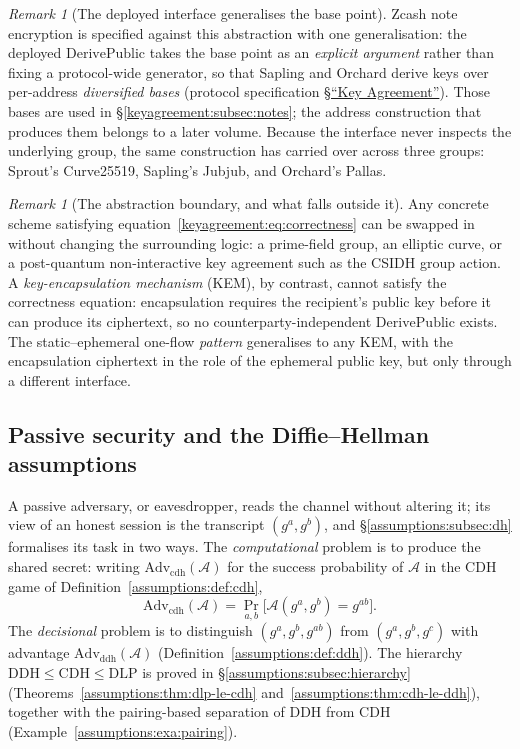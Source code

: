 \documentclass[11pt,a4paper]{article}
\theoremstyle{definition}
\theoremstyle{remark}
\newtheorem{remark}[theorem]{Remark}
\begin{document}
\begin{remark}[The deployed interface generalises the base point]
\label{keyagreement:rem:deployed-abstraction}
Zcash note encryption is specified against this abstraction with one
generalisation: the deployed \(\mathrm{DerivePublic}\) takes the base
point as an \emph{explicit argument} rather than fixing a
protocol-wide generator, so that Sapling and Orchard derive keys over
per-address \emph{diversified bases} (protocol specification
\href{https://zips.z.cash/protocol/protocol.pdf\#abstractkeyagreement}{\S``Key Agreement''}).
Those bases are used in \S\ref{keyagreement:subsec:notes}; the address
construction that produces them belongs to a later volume. Because the
interface never inspects the underlying group, the same construction
has carried over across three groups: Sprout's Curve25519, Sapling's
Jubjub, and Orchard's Pallas.
\end{remark}

\begin{remark}[The abstraction boundary, and what falls outside it]
\label{keyagreement:rem:boundary}
Any concrete scheme satisfying
equation~\eqref{keyagreement:eq:correctness} can be swapped in
without changing the surrounding logic: a prime-field group, an
elliptic curve, or a post-quantum non-interactive key agreement such
as the CSIDH group action. A \emph{key-encapsulation mechanism}
(KEM), by contrast, cannot satisfy the correctness equation:
encapsulation requires the recipient's public key before it can
produce its ciphertext, so no counterparty-independent
\(\mathrm{DerivePublic}\) exists. The static--ephemeral one-flow
\emph{pattern} generalises to any KEM, with the encapsulation
ciphertext in the role of the ephemeral public key, but only through a
different interface.
\end{remark}

\subsection{Passive security and the Diffie--Hellman assumptions}
\label{keyagreement:subsec:passive}

A passive adversary, or eavesdropper, reads the channel without
altering it; its view of an honest session is the transcript
\((g^{a}, g^{b})\), and \S\ref{assumptions:subsec:dh} formalises its
task in two ways. The \emph{computational} problem is to produce the
shared secret: writing
\(\mathrm{Adv}_{\mathrm{cdh}}(\mathcal{A})\) for the success
probability of \(\mathcal{A}\) in the CDH game of
Definition~\ref{assumptions:def:cdh},
\[
\mathrm{Adv}_{\mathrm{cdh}}(\mathcal{A})
= \Pr_{a,b}\bigl[\mathcal{A}(g^{a}, g^{b}) = g^{ab}\bigr].
\]
The \emph{decisional} problem is to distinguish
\((g^{a}, g^{b}, g^{ab})\) from \((g^{a}, g^{b}, g^{c})\) with
advantage \(\mathrm{Adv}_{\mathrm{ddh}}(\mathcal{A})\)
(Definition~\ref{assumptions:def:ddh}). The hierarchy
\(\mathrm{DDH} \le \mathrm{CDH} \le \mathrm{DLP}\) is proved in
\S\ref{assumptions:subsec:hierarchy}
(Theorems~\ref{assumptions:thm:dlp-le-cdh}
and~\ref{assumptions:thm:cdh-le-ddh}), together with the
pairing-based separation of DDH from CDH
(Example~\ref{assumptions:exa:pairing}).
\end{document}
